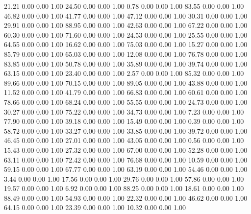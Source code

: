    21.21   0.00   0.00   1.00
   24.50   0.00   0.00   1.00
    0.78   0.00   0.00   1.00
   83.55   0.00   0.00   1.00
   46.82   0.00   0.00   1.00
   41.77   0.00   0.00   1.00
   47.12   0.00   0.00   1.00
   30.31   0.00   0.00   1.00
   29.91   0.00   0.00   1.00
   88.95   0.00   0.00   1.00
   42.63   0.00   0.00   1.00
   67.22   0.00   0.00   1.00
   60.30   0.00   0.00   1.00
   71.60   0.00   0.00   1.00
   24.53   0.00   0.00   1.00
   25.55   0.00   0.00   1.00
   64.55   0.00   0.00   1.00
   16.62   0.00   0.00   1.00
   75.03   0.00   0.00   1.00
   15.27   0.00   0.00   1.00
   85.79   0.00   0.00   1.00
   65.03   0.00   0.00   1.00
   12.08   0.00   0.00   1.00
   76.78   0.00   0.00   1.00
   83.85   0.00   0.00   1.00
   50.78   0.00   0.00   1.00
   35.89   0.00   0.00   1.00
   39.74   0.00   0.00   1.00
   63.15   0.00   0.00   1.00
   23.40   0.00   0.00   1.00
    2.57   0.00   0.00   1.00
   85.32   0.00   0.00   1.00
   89.66   0.00   0.00   1.00
   70.15   0.00   0.00   1.00
   89.05   0.00   0.00   1.00
   43.88   0.00   0.00   1.00
   11.52   0.00   0.00   1.00
   41.79   0.00   0.00   1.00
   66.83   0.00   0.00   1.00
   60.61   0.00   0.00   1.00
   78.66   0.00   0.00   1.00
   68.24   0.00   0.00   1.00
   55.55   0.00   0.00   1.00
   24.73   0.00   0.00   1.00
   30.27   0.00   0.00   1.00
   75.22   0.00   0.00   1.00
   34.73   0.00   0.00   1.00
    7.23   0.00   0.00   1.00
   77.90   0.00   0.00   1.00
   39.18   0.00   0.00   1.00
   15.49   0.00   0.00   1.00
    0.39   0.00   0.00   1.00
   58.72   0.00   0.00   1.00
   33.27   0.00   0.00   1.00
   33.85   0.00   0.00   1.00
   39.72   0.00   0.00   1.00
   46.45   0.00   0.00   1.00
   27.01   0.00   0.00   1.00
   43.05   0.00   0.00   1.00
    0.56   0.00   0.00   1.00
   15.43   0.00   0.00   1.00
   27.32   0.00   0.00   1.00
   67.00   0.00   0.00   1.00
   52.28   0.00   0.00   1.00
   63.11   0.00   0.00   1.00
   72.42   0.00   0.00   1.00
   76.68   0.00   0.00   1.00
   10.59   0.00   0.00   1.00
   59.15   0.00   0.00   1.00
   67.77   0.00   0.00   1.00
   63.19   0.00   0.00   1.00
   54.46   0.00   0.00   1.00
    3.44   0.00   0.00   1.00
   17.56   0.00   0.00   1.00
   29.76   0.00   0.00   1.00
   57.86   0.00   0.00   1.00
   19.57   0.00   0.00   1.00
    6.92   0.00   0.00   1.00
   88.25   0.00   0.00   1.00
   18.61   0.00   0.00   1.00
   88.49   0.00   0.00   1.00
   54.93   0.00   0.00   1.00
   22.32   0.00   0.00   1.00
   46.62   0.00   0.00   1.00
   64.15   0.00   0.00   1.00
   23.39   0.00   0.00   1.00
   10.32   0.00   0.00   1.00
